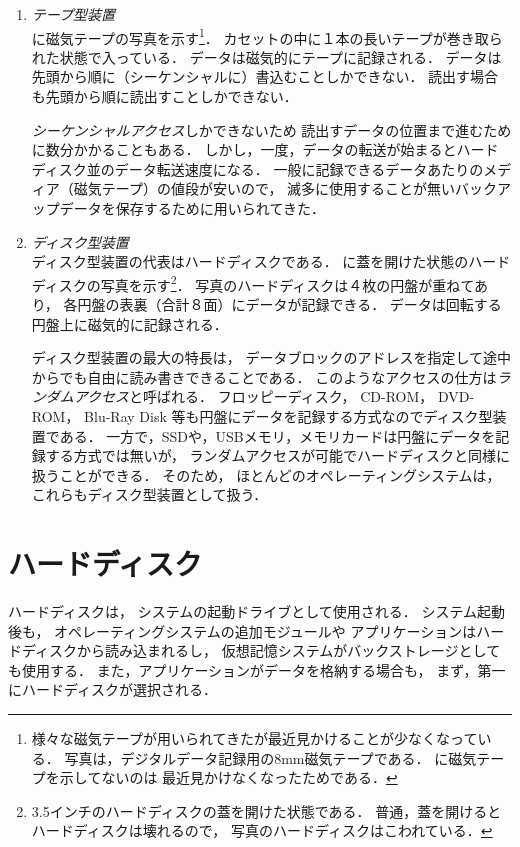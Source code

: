 \begin{enumerate}
\item \emph{テープ型装置}\\
に磁気テープの写真を示す\footnote{
様々な磁気テープが用いられてきたが最近見かけることが少なくなっている．
写真は，デジタルデータ記録用の8mm磁気テープである．
に磁気テープを示してないのは
最近見かけなくなったためである．
}．
カセットの中に１本の長いテープが巻き取られた状態で入っている．
データは磁気的にテープに記録される．
データは先頭から順に（シーケンシャルに）書込むことしかできない．
読出す場合も先頭から順に読出すことしかできない．

\emph{シーケンシャルアクセス}しかできないため
読出すデータの位置まで進むために数分かかることもある．
しかし，一度，データの転送が始まるとハードディスク並のデータ転送速度になる．
一般に記録できるデータあたりのメディア（磁気テープ）の値段が安いので，
滅多に使用することが無いバックアップデータを保存するために用いられてきた．


\item \emph{ディスク型装置} \\
ディスク型装置の代表はハードディスクである．
に蓋を開けた状態のハードディスクの写真を示す\footnote{
3.5インチのハードディスクの蓋を開けた状態である．
普通，蓋を開けるとハードディスクは壊れるので，
写真のハードディスクはこわれている．}．
写真のハードディスクは４枚の円盤が重ねてあり，
各円盤の表裏（合計８面）にデータが記録できる．
データは回転する円盤上に磁気的に記録される．

ディスク型装置の最大の特長は，
データブロックのアドレスを指定して途中からでも自由に読み書きできることである．
このようなアクセスの仕方は\emph{ランダムアクセス}と呼ばれる．
フロッピーディスク，
CD-ROM，
DVD-ROM，
Blu-Ray Disk 等も円盤にデータを記録する方式なのでディスク型装置である．
一方で，SSDや，USBメモリ，メモリカードは円盤にデータを記録する方式では無いが，
ランダムアクセスが可能でハードディスクと同様に扱うことができる．
そのため，
ほとんどのオペレーティングシステムは，これらもディスク型装置として扱う．


\end{enumerate}

\section{ハードディスク}
ハードディスクは，
システムの起動ドライブとして使用される．
システム起動後も，
オペレーティングシステムの追加モジュールや
アプリケーションはハードディスクから読み込まれるし，
仮想記憶システムがバックストレージとしても使用する．
また，アプリケーションがデータを格納する場合も，
まず，第一にハードディスクが選択される．

